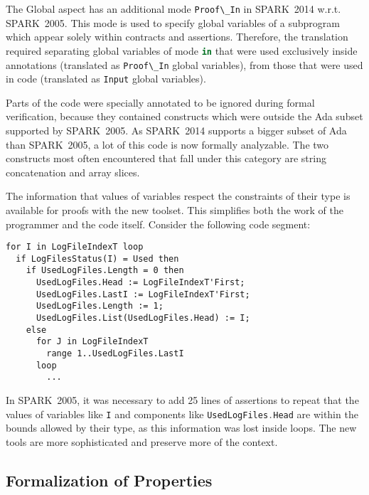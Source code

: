 \documentclass[10pt,a4paper,twocolumn]{article}
\newcommand{\oldspark}{SPARK~2005\xspace}
\newcommand{\newspark}{SPARK~2014\xspace}
\newcommand{\wrt}{w.r.t.\xspace}
\newcommand{\SPARK}[1]{\lstinline[language=Ada,basicstyle={\footnotesize
      \sffamily},framesep=0pt]$#1$}
\begin{document}
The Global aspect has an additional mode \SPARK{Proof\_In} in \newspark \wrt
\oldspark. This mode is used to specify global variables of a subprogram which
appear solely within contracts and assertions. Therefore, the translation
required separating global variables of mode \SPARK{in} that were used
exclusively inside annotations (translated as \SPARK{Proof\_In} global
variables), from those that were used in code (translated as \SPARK{Input}
global variables).

Parts of the code were specially annotated to be ignored during formal
verification, because they contained constructs which were outside the Ada
subset supported by \oldspark. As \newspark supports a bigger subset of Ada
than \oldspark, a lot of this code is now formally analyzable. The two
constructs most often encountered that fall under this category are string
concatenation and array slices.

The information that values of variables respect the constraints of their type
is available for proofs with the new toolset. This simplifies both the work of
the programmer and the code itself. Consider the following code segment:

\begin{lstlisting}
for I in LogFileIndexT loop
  if LogFilesStatus(I) = Used then
    if UsedLogFiles.Length = 0 then
      UsedLogFiles.Head := LogFileIndexT'First;
      UsedLogFiles.LastI := LogFileIndexT'First;
      UsedLogFiles.Length := 1;
      UsedLogFiles.List(UsedLogFiles.Head) := I;
    else
      for J in LogFileIndexT
        range 1..UsedLogFiles.LastI
      loop
        ...
\end{lstlisting}

In \oldspark, it was necessary to add 25 lines of assertions to repeat that the
values of variables like \SPARK{I} and components like
\SPARK{UsedLogFiles.Head} are within the bounds allowed by their type, as this
information was lost inside loops. The new tools are more sophisticated and
preserve more of the context.


\subsection{Formalization of Properties}
\end{document}
